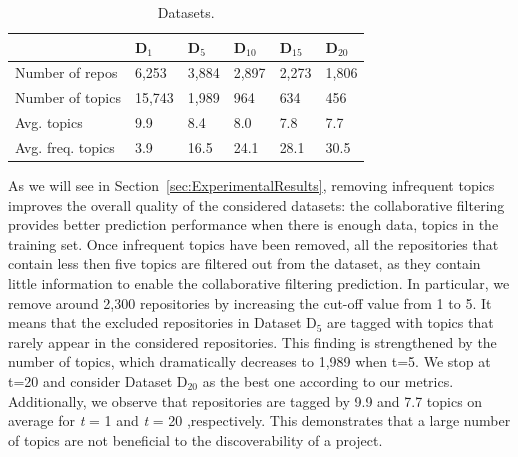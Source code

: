 \begin{table}[h!]
	\caption{Datasets.}
	\begin{tabular}{|l|p{0.68cm}|p{0.68cm}|p{0.68cm}|p{0.68cm}|p{0.68cm}|} \hline
		 & \textbf{ D$_{1}$} & \textbf{D$_{5}$} & \textbf{ D$_{10}$} & \textbf{D$_{15}$} & \textbf{D$_{20}$} \\ \hline
		Number of repos & 6,253 & 3,884 & 2,897  & 2,273 & 1,806  \\ \hline
		Number of topics & 15,743 & 1,989 & 964 & 634 & 456 \\ \hline
		Avg. topics & 9.9 & 8.4 & 8.0  & 7.8 & 7.7 \\ \hline
		Avg. freq. topics & 3.9  & 16.5  & 24.1  & 28.1  & 30.5  \\ \hline
	\end{tabular}	
	\label{tab:Datasets}	
\end{table}



As we will see in Section~\ref{sec:ExperimentalResults}, removing infrequent topics improves the overall quality of the considered datasets: %
the collaborative filtering provides better prediction performance when there is enough data, \ie topics in the training set. %
Once infrequent topics have been removed, all the repositories that contain less then five topics are filtered out from the dataset, as they contain little information to enable the collaborative filtering prediction. In particular, we remove around 2,300 repositories by increasing the cut-off value from 1 to 5. It means that the excluded repositories in Dataset D$_5$ are tagged with topics that rarely appear in the considered repositories. This finding is strengthened by the number of topics, which dramatically decreases to 1,989 when t=5. %
We stop at t=20 and consider Dataset D$_{20}$ as the best one according to our metrics. Additionally, we observe that repositories are tagged by 9.9 and 7.7 topics on average for \emph{t} = 1 and \emph{t} = 20 ,respectively. This demonstrates that a large number of topics are not beneficial to the discoverability of a project.

